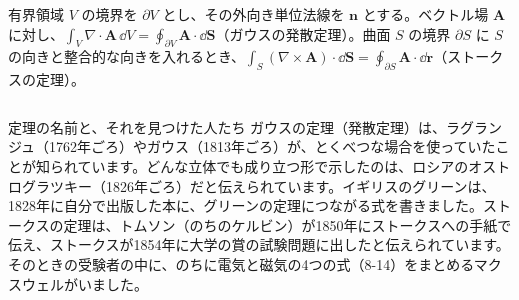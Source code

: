 \begin{senmonsho}[ベクトル解析の教科書ふうの書き方]
\begin{bkhonbun}
有界領域 $V$ の境界を $\partial V$ とし、その外向き単位法線を $\symbf n$ とする。ベクトル場 $\symbf A$ に対し、$\displaystyle\int_V\nabla\cdot\symbf A\,\dd V=\oint_{\partial V}\symbf A\cdot\dd\symbf S$（ガウスの発散定理）。曲面 $S$ の境界 $\partial S$ に $S$ の向きと整合的な向きを入れるとき、$\displaystyle\int_S(\nabla\times\symbf A)\cdot\dd\symbf S=\oint_{\partial S}\symbf A\cdot\dd\symbf r$（ストークスの定理）。
\end{bkhonbun}
\end{senmonsho}

\begin{column}{定理の名前と、それを見つけた人たち}
ガウスの定理（発散定理）は、ラグランジュ（1762年ごろ）やガウス（1813年ごろ）が、とくべつな場合を使っていたことが知られています。どんな立体でも成り立つ形で示したのは、ロシアのオストログラツキー（1826年ごろ）だと伝えられています。イギリスのグリーンは、1828年に自分で出版した本に、グリーンの定理につながる式を書きました。ストークスの定理は、トムソン（のちのケルビン）が1850年にストークスへの手紙で伝え、ストークスが1854年に大学の賞の試験問題に出したと伝えられています。そのときの受験者の中に、のちに電気と磁気の4つの式（8-14）をまとめるマクスウェルがいました。
\end{column}

